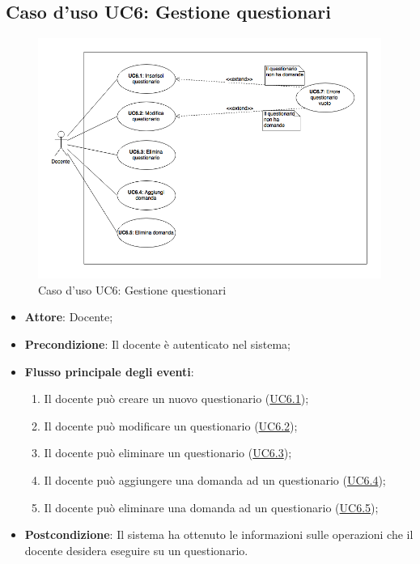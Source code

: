 \documentclass[12pt,a4paper]{article}
\begin{document}
\subsection{Caso d'uso UC6: Gestione questionari}
\begin{figure}[H]
	\centering
	\includegraphics[width=\textwidth]{diagramUC6.png}
	\caption{Caso d'uso UC6: Gestione questionari}\label{fig:UC6} 
\end{figure}
\begin{itemize}

\item \textbf{Attore}: Docente; 
\item \textbf{Precondizione}: Il docente è autenticato nel sistema;

\item \textbf{Flusso principale degli eventi}:
\begin{enumerate}
	\item Il docente può creare un nuovo questionario (\hyperlink{UC6.1}{UC6.1});
	\item Il docente può modificare un questionario (\hyperlink{UC6.2}{UC6.2});
	\item Il docente può eliminare un questionario (\hyperlink{UC6.3}{UC6.3});
	\item Il docente può aggiungere una domanda ad un questionario (\hyperlink{UC6.4}{UC6.4});
	\item Il docente può eliminare una domanda ad un questionario (\hyperlink{UC6.5}{UC6.5});
	
\end{enumerate}
\item \textbf{Postcondizione}: Il sistema ha ottenuto le informazioni sulle operazioni che
il docente desidera eseguire su un questionario.
\end{itemize}
\hypertarget{UC6.1}{}
\end{document}
